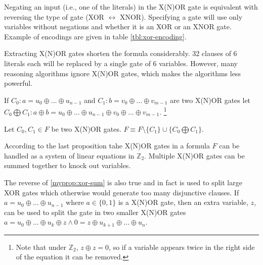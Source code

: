 Negating an input (i.e., one of the literals) in the X(N)OR gate is
equivalent with reversing the type of gate (XOR $\leftrightarrow$
XNOR). Specifying a gate will use only variables without negations
and whether it is an XOR or an XNOR gate.  Example of encodings are
given in table \ref{tbl:xor-encoding}.

Extracting X(N)OR gates shorten the formula considerably. 32
clauses of 6 literals each will be replaced by a single gate of 6
variables. However, many reasoning algorithms ignore X(N)OR gates,
which makes the algorithms less powerful.

\begin{table}
  \centering

  \caption{Example of CNF encodings of XOR and XNOR gates}
  \label{tbl:xor-encoding}
\end{table}


\begin{mydef}
  \label{myprop:xor-sum}
  If $C_0: a = u_0 \oplus \ldots \oplus u_{n-1}$ and $C_1: b =
  v_0 \oplus \ldots \oplus v_{m-1}$ are two X(N)OR gates let $C_0
  \bigoplus C_1: a \oplus b = u_0 \oplus \ldots \oplus u_{n-1}
  \oplus v_0 \oplus \ldots \oplus v_{m-1}$. \footnote{Note that
  under $\mathbb{Z}_2$, $z \oplus z = 0$, so if a variable appears
  twice in the right side of the equation it can be removed.}
\end{mydef}

\begin{myprop}
  Let $C_0, C_1 \in F$ be two X(N)OR gates. $F \equiv F \setminus \{C_1\} \cup
  \{C_0 \bigoplus C_1\}$.
\end{myprop}

According to the last proposition tahe X(N)OR gates in a
formula $F$ can be handled as a system of linear equations in
$\mathbb{Z}_2$. Multiple X(N)OR gates can be summed together to
knock out variables.

The reverse of \ref{myprop:xor-sum} is also true and in fact is
used to split large XOR gates which otherwise would generate too
many disjunctive clauses. If $a = u_0 \oplus \ldots \oplus u_{n-1}$
where $a \in \{0, 1\}$ is a X(N)OR gate, then an extra variable,
$z$, can be used to split the gate in two smaller X(N)OR gates $a =
u_0 \oplus \ldots \oplus u_{k} \oplus z \land 0 = z \oplus u_{k +
1} \oplus \ldots \oplus u_{n}$.


